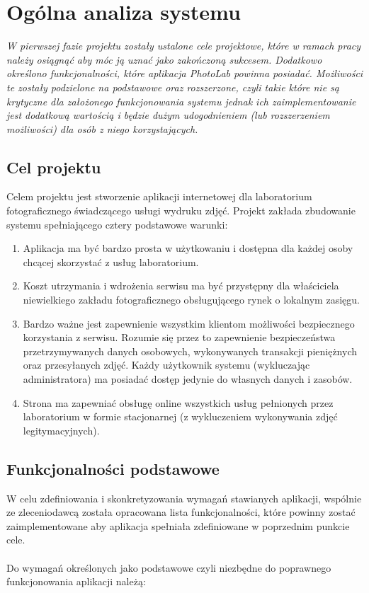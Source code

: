 \chapter{Ogólna analiza systemu}

{\em \quad W pierwszej fazie projektu zostały ustalone cele projektowe, które w ramach pracy należy osiągnąć aby móc ją uznać jako zakończoną sukcesem. Dodatkowo określono funkcjonalności, które aplikacja \textit{PhotoLab} powinna posiadać. Możliwości te zostały podzielone na podstawowe oraz rozszerzone, czyli takie które nie są krytyczne dla założonego funkcjonowania systemu jednak ich zaimplementowanie
jest dodatkową wartością i będzie dużym udogodnieniem (lub rozszerzeniem możliwości) dla osób z niego korzystających. }

\section{Cel projektu}
\quad Celem projektu jest stworzenie aplikacji internetowej dla laboratorium fotograficznego świadczącego usługi wydruku zdjęć. Projekt zakłada zbudowanie systemu spełniającego cztery podstawowe warunki:
\begin{enumerate}
    \item Aplikacja ma być bardzo prosta w użytkowaniu i dostępna dla każdej osoby chcącej skorzystać z usług laboratorium.
    \item Koszt utrzymania i wdrożenia serwisu ma być przystępny dla właściciela niewielkiego zakładu fotograficznego obsługującego rynek o lokalnym zasięgu.
    \item Bardzo ważne jest zapewnienie wszystkim klientom możliwości bezpiecznego korzystania z serwisu. Rozumie się przez to zapewnienie bezpieczeństwa przetrzymywanych danych osobowych, wykonywanych transakcji pieniężnych oraz przesyłanych zdjęć. Każdy użytkownik systemu (wykluczając administratora) ma posiadać dostęp jedynie do własnych danych i zasobów.
    \item Strona ma zapewniać obsługę online wszystkich usług pełnionych przez laboratorium w formie stacjonarnej (z wykluczeniem wykonywania zdjęć legitymacyjnych).
\end{enumerate}



\section{Funkcjonalności podstawowe}
\quad W celu zdefiniowania i skonkretyzowania wymagań stawianych aplikacji, wspólnie ze zleceniodawcą została opracowana lista funkcjonalności, które powinny zostać zaimplementowane aby aplikacja spełniała zdefiniowane w poprzednim punkcie cele. \\
\\
Do wymagań określonych jako podstawowe czyli niezbędne do poprawnego funkcjonowania aplikacji należą:



